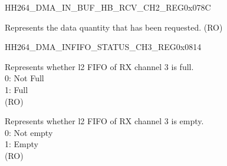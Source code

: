     
    \begin{register}{H}{H264\_DMA\_IN\_BUF\_HB\_RCV\_CH2\_REG}{0x078C}\label{regdesc:H264DMAINBUFHBRCVCH2REG}
    \regnewline%
    \begin{regdesc}\begin{reglist}
    \label{fielddesc:H264DMAINCMDFIFOBUFHBRCVCH2}\item [H264\_DMA\_IN\_CMDFIFO\_BUF\_HB\_RCV\_CH2] Represents the data quantity that has been requested. (RO)
    \end{reglist}\end{regdesc}
    \end{register}
    
    \begin{register}{H}{H264\_DMA\_INFIFO\_STATUS\_CH3\_REG}{0x0814}\label{regdesc:H264DMAINFIFOSTATUSCH3REG}
    \regnewline%
    \begin{regdesc}\begin{reglist}
    \label{fielddesc:H264DMAINFIFOFULLL2CH3}\item [H264\_DMA\_INFIFO\_FULL\_L2\_CH3] Represents whether l2 FIFO of RX channel 3 is full.\\
    0: Not Full\\
    1: Full \\(RO)
    \label{fielddesc:H264DMAINFIFOEMPTYL2CH3}\item [H264\_DMA\_INFIFO\_EMPTY\_L2\_CH3] Represents whether l2 FIFO of RX channel 3 is empty.\\
    0: Not empty\\
    1: Empty\\ (RO)

\end{reglist}
\end{regdesc}
\end{register}
